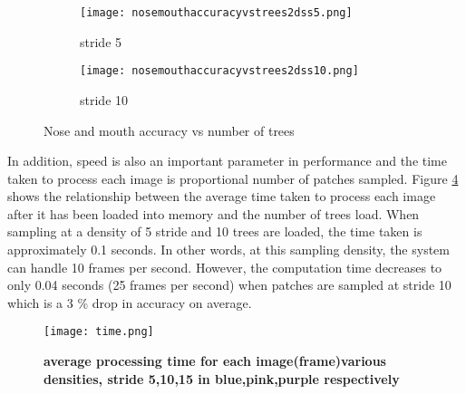 \begin{figure}
        \centering
	 \begin{subfigure}[b]{0.5\textwidth}
                \texttt{[image: nosemouthaccuracyvstrees2dss5.png]}
                \caption{stride 5}
                \label{fig:eyesstride5}
        \end{subfigure}%
        \begin{subfigure}[b]{0.5\textwidth}
                \texttt{[image: nosemouthaccuracyvstrees2dss10.png]}
                \caption{stride 10}
                \label{fig:eyestride5}
        \end{subfigure}%
        \caption{Nose and mouth accuracy vs number of trees}\label{fig:noseandmouth}
\end{figure}

In addition, speed is also an important parameter in performance and the time taken to process each image is proportional number of patches sampled. Figure \ref{fig:time} shows the relationship between the average time taken to process each image after it has been loaded into memory and the number of trees load. When sampling at a density of 5 stride and 10 trees are loaded, the time taken is approximately 0.1 seconds. In other words, at this sampling density, the system can handle 10 frames per second. However, the computation time decreases to only 0.04 seconds (25 frames per second) when patches are sampled at stride 10 which is a 3 \% drop in accuracy on average.


\begin{figure}
	\centering
	\texttt{[image: time.png]}
	\caption[Processing time vs number of trees]{\label{fig:time}}  \textbf{average processing time for each image(frame)various densities, stride 5,10,15 in blue,pink,purple respectively }
\end{figure}